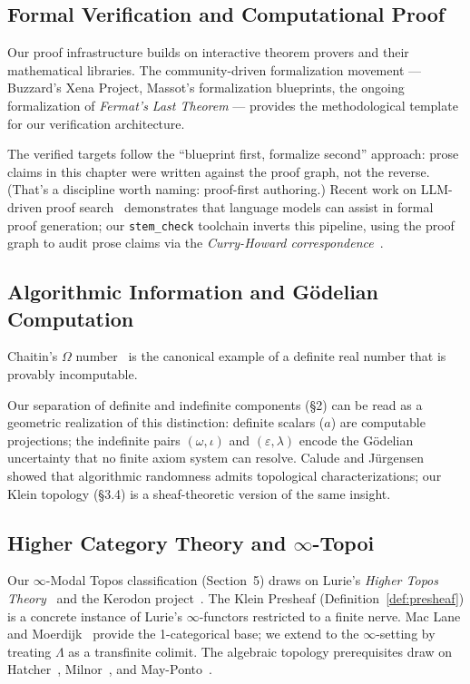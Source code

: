 \documentclass[12pt,oneside]{article}
\theoremstyle{principia}
\theoremstyle{definition}
\theoremstyle{remark}
\providecommand{\eps}{\varepsilon}
\providecommand{\lam}{\lambda}
\begin{document}
\subsection*{Formal Verification and Computational Proof}

Our proof infrastructure builds on interactive theorem provers and their mathematical libraries. The community-driven formalization movement --- Buzzard's Xena Project, Massot's formalization blueprints, the ongoing formalization of \emph{Fermat's Last Theorem} --- provides the methodological template for our verification architecture.

The verified targets follow the ``blueprint first, formalize second'' approach: prose claims in this chapter were written against the proof graph, not the reverse. (That's a discipline worth naming: proof-first authoring.) Recent work on LLM-driven proof search~\cite{autoformbot,safe-verification} demonstrates that language models can assist in formal proof generation; our \texttt{stem\_check} toolchain inverts this pipeline, using the proof graph to audit prose claims via the \emph{Curry-Howard correspondence}~\cite{curry-howard}.

\subsection*{Algorithmic Information and G\"odelian Computation}

Chaitin's $\Omega$ number~\cite{chaitin-omega} is the canonical example of a definite real number that is provably incomputable.

Our separation of definite and indefinite components (\S2) can be read as a geometric realization of this distinction: definite scalars ($a$) are computable projections; the indefinite pairs $(\omega, \iota)$ and $(\eps, \lam)$ encode the G\"odelian uncertainty that no finite axiom system can resolve. Calude and J\"urgensen~\cite{calude-randomness} showed that algorithmic randomness admits topological characterizations; our Klein topology (\S3.4) is a sheaf-theoretic version of the same insight.

\subsection*{Higher Category Theory and $\infty$-Topoi}

Our $\infty$-Modal Topos classification (Section~5) draws on Lurie's \emph{Higher Topos Theory}~\cite{lurie-htt} and the Kerodon project~\cite{kerodon}. The Klein Presheaf (Definition~\ref{def:presheaf}) is a concrete instance of Lurie's $\infty$-functors restricted to a finite nerve. Mac Lane and Moerdijk~\cite{maclane-moerdijk} provide the 1-categorical base; we extend to the $\infty$-setting by treating $\Lambda$ as a transfinite colimit. The algebraic topology prerequisites draw on Hatcher~\cite{hatcher}, Milnor~\cite{milnor}, and May-Ponto~\cite{may-ponto}.
\end{document}
